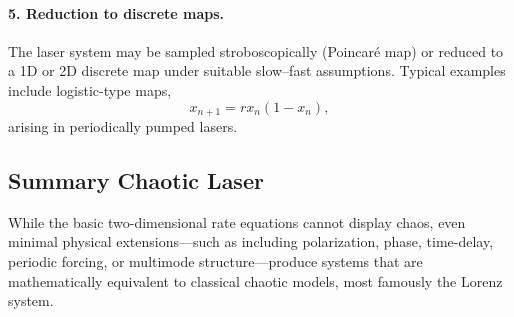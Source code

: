 \documentclass[11pt]{amsart}
\begin{document}
\paragraph{5. Reduction to discrete maps.}
The laser system may be sampled stroboscopically (Poincaré map) or reduced to a
1D or 2D discrete map under suitable slow–fast assumptions.  
Typical examples include logistic-type maps,
\[
x_{n+1} = r x_n (1 - x_n),
\]
arising in periodically pumped lasers.

\subsection{Summary Chaotic Laser}

While the basic two-dimensional rate equations cannot display chaos, even
minimal physical extensions---such as including polarization, phase, time-delay,
periodic forcing, or multimode structure---produce systems that are
mathematically equivalent to classical chaotic models, most famously the
Lorenz system.
\end{document}
